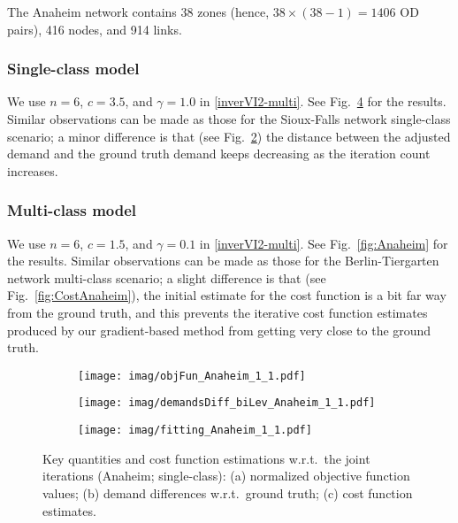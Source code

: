 \documentclass[3p]{elsarticle}
\begin{document}
The Anaheim network \cite{BarGera16} contains 38 zones (hence, $38
\times (38 - 1) = 1406$ OD pairs), 416 nodes, and 914 links.

\subsubsection*{Single-class model}
We use $n=6$, $c = 3.5$, and $\gamma = 1.0$ in
\eqref{inverVI2-multi}. See Fig.~\ref{fig:uni_Anaheim} for the
results. Similar observations can be made as those for the Sioux-Falls
network single-class scenario; a minor difference is that (see
Fig.~\ref{fig:uni_demandsDiff_biLev_Anaheim}) the distance between the
adjusted demand and the ground truth demand keeps decreasing as the
iteration count increases.
	
\subsubsection*{Multi-class model}
We use $n=6$, $c = 1.5$, and $\gamma = 0.1$ in
\eqref{inverVI2-multi}. See Fig.~\ref{fig:Anaheim} for the
results. Similar observations can be made as those for the
Berlin-Tiergarten network multi-class scenario; a slight difference is
that (see Fig.~\ref{fig:CostAnaheim}), the initial estimate for the cost
function is a bit far way from the ground truth, and this prevents the
iterative cost function estimates produced by our gradient-based method
from getting very close to the ground truth.

\begin{figure}[H]  
	\centering
	\begin{subfigure}[b]{0.8\textwidth}
		\texttt{[image: imag/objFun\_Anaheim\_1\_1.pdf]}
		\caption{}
		\label{fig:uni_objFun_Anaheim}
	\end{subfigure} 
	\begin{subfigure}[b]{0.8\textwidth}
		\texttt{[image: imag/demandsDiff\_biLev\_Anaheim\_1\_1.pdf]}
		\caption{}
		\label{fig:uni_demandsDiff_biLev_Anaheim}
	\end{subfigure}   
	\begin{subfigure}[b]{0.8\textwidth}
		\texttt{[image: imag/fitting\_Anaheim\_1\_1.pdf]}
		\caption{}
		\label{fig:uni_CostAnaheim}
	\end{subfigure}  
	\caption{Key quantities and cost function estimations w.r.t.\
          the joint iterations (Anaheim; single-class): (a) normalized
          objective function values; (b) demand differences w.r.t.\
          ground truth; (c) cost function estimates.}
	\label{fig:uni_Anaheim}
\end{figure}
	
\end{document}
